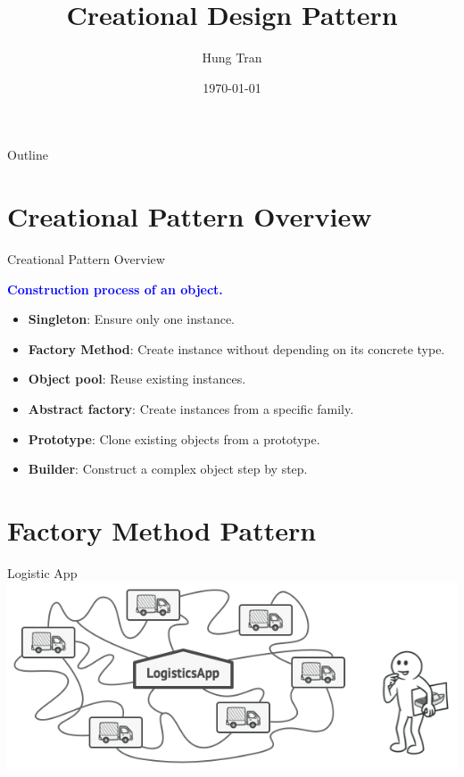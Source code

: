 \documentclass[13pt]{beamer}
\title[Design Pattern]{Creational Design Pattern}
\author{Hung Tran}
\institute{Fpt software}
\date{\today}
\begin{document}
\begin{frame}
  \titlepage
\end{frame}

\begin{frame}{Outline}
  \tableofcontents
\end{frame}

\section{Creational Pattern Overview}

\begin{frame}{Creational Pattern Overview}
	\begin{center}
	\textcolor{blue}{\textbf{Construction process of an object.}}
	\end{center}
	\begin{itemize}
		\setlength\itemsep{1em}
		\item \textbf{Singleton}: Ensure only one instance.
		\item \textbf{Factory Method}: Create instance without depending on its concrete type.
		\item \textbf{Object pool}: Reuse existing instances.
		\item \textbf{Abstract factory}: Create instances from a specific family.
		\item \textbf{Prototype}: Clone existing objects from a prototype.
		\item \textbf{Builder}: Construct a complex object step by step.
	\end{itemize}
\end{frame}

\section{Factory Method Pattern}

\begin{frame}{Logistic App}
\includegraphics[scale=0.5]{./images/truckLogistic.png}
\end{frame}
\end{document}
